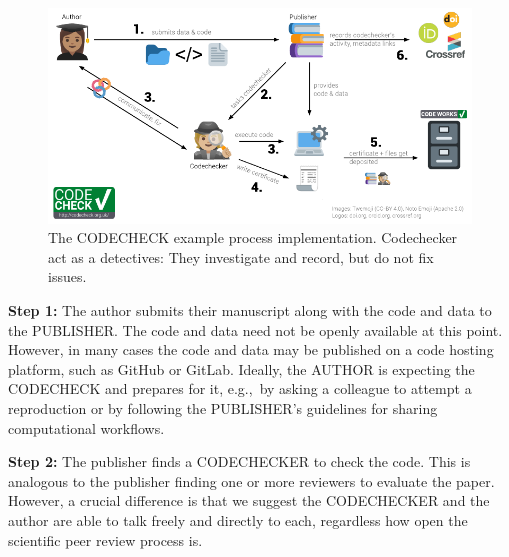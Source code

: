 \documentclass[12pt]{article}
\begin{document}
\begin{figure}
  \centering
      \includegraphics[width=\textwidth]{figs/codecheck_overview.pdf}
  \caption{The CODECHECK example process implementation. Codechecker act as a detectives:
  They investigate and record, but do not fix issues.}
  \label{fig:workflow}
\end{figure}

\textbf{Step 1:} The author submits their manuscript along with the code and data to the PUBLISHER.
The code and data need not be openly available at this point.
However, in many cases the code and data may be published on a code hosting platform,
such as GitHub or GitLab. Ideally, the AUTHOR is expecting the CODECHECK and
prepares for it, e.g.,~by asking a colleague to attempt a reproduction or by 
following the PUBLISHER's guidelines for sharing computational workflows.

\textbf{Step 2:} The publisher finds a CODECHECKER to check the code. This is
analogous to the publisher finding one or more reviewers to evaluate
the paper.
However, a crucial difference is that we suggest the CODECHECKER and the author are able to talk freely and directly to each, regardless how open the scientific peer review process is.
\end{document}

